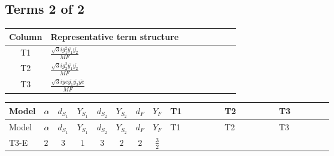 \documentclass[8pt]{article}
\begin{document}
\begin{landscape}
\subsection*{Terms 2 of 2}
\begin{center}
\begin{tabular}{@{}c >{\raggedright\arraybackslash}p{0.82\linewidth}@{}}
\toprule
Column & Representative term structure \\
\midrule
T1 & \(\displaystyle \frac{\sqrt{3} i g_{1}^{2} \overline{y_{1}} \overline{y_{2}}}{MF}\) \\
\midrule
T2 & \(\displaystyle \frac{\sqrt{3} i g_{2}^{2} \overline{y_{1}} \overline{y_{2}}}{MF}\) \\
\midrule
T3 & \(\displaystyle \frac{\sqrt{3} i ye \overline{y_{1}} \overline{y_{2}} \overline{ye}}{MF}\) \\
\midrule
\bottomrule
\end{tabular}
\end{center}
\smallskip
\tiny
\begin{longtable}{@{}llcccccc >{\raggedright\arraybackslash}p{0.21\linewidth} >{\raggedright\arraybackslash}p{0.21\linewidth} >{\raggedright\arraybackslash}p{0.21\linewidth}@{}}
\toprule
Model & $\alpha$ & $d_{S_1}$ & $Y_{S_1}$ & $d_{S_2}$ & $Y_{S_2}$ & $d_F$ & $Y_F$ & T1 & T2 & T3 \\
\midrule
\endfirsthead
\toprule
Model & $\alpha$ & $d_{S_1}$ & $Y_{S_1}$ & $d_{S_2}$ & $Y_{S_2}$ & $d_F$ & $Y_F$ & T1 & T2 & T3 \\
\midrule
\endhead
T3-E & $2$ & $3$ & $1$ & $3$ & $2$ & $2$ & $\frac{3}{2}$ & \scriptsize\adjustbox{max width=\linewidth}{$\begin{gathered} \frac{9 \sqrt{3} i g_{1}^{2} \overline{y_{1}} \overline{y_{2}}}{8 MF}\end{gathered}$} & \scriptsize\adjustbox{max width=\linewidth}{$\begin{gathered} \frac{11 \sqrt{3} i g_{2}^{2} \overline{y_{1}} \overline{y_{2}}}{8 MF}\end{gathered}$} & \scriptsize\adjustbox{max width=\linewidth}{$\begin{gathered} - \frac{\sqrt{3} i ye \overline{y_{1}} \overline{y_{2}} \overline{ye}}{12 MF}\end{gathered}$} \\
\midrule
\bottomrule
\end{longtable}
\end{landscape}
\end{document}
